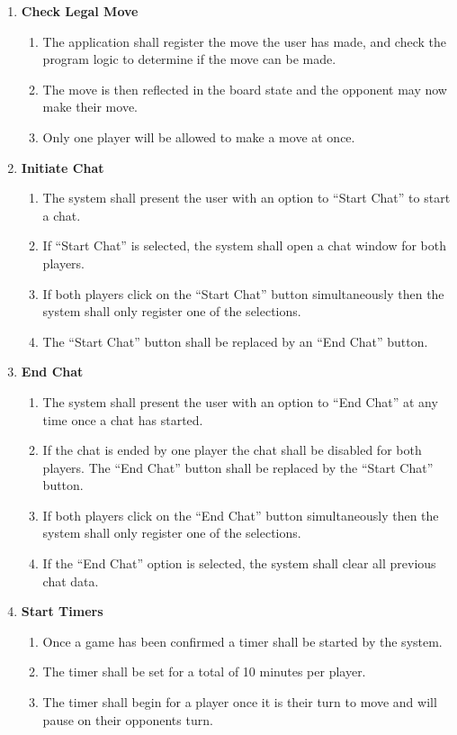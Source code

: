 \documentclass[]{article}
\begin{document}
\begin{enumerate}[{UC}1.]
	\item \textbf{Check Legal Move}
	\begin{enumerate}[{FR}1., resume]
		\item The application shall register the move the user has made, and check the program logic to determine if the move can be made.
		\item The move is then reflected in the board state and the opponent may now make their move.
		\item Only one player will be allowed to make a move at once.
	\end{enumerate}
	
	\item \textbf{Initiate Chat}
	\begin{enumerate}[{FR}1., resume]
		\item The system shall present the user with an option to ``Start Chat'' to start a chat.
		\item If ``Start Chat'' is selected, the system shall open a chat window for both players.
		\item If both players click on the ``Start Chat'' button simultaneously then the system shall only register one of the selections.
		\item The ``Start Chat'' button shall be replaced by an ``End Chat'' button.
	\end{enumerate}
	
	\item \textbf{End Chat}
	\begin{enumerate}[{FR}1., resume]
		\item The system shall present the user with an option to ``End Chat'' at any time once a chat has started.
		\item If the chat is ended by one player the chat shall be disabled for both players. The ``End Chat'' button shall be replaced by the ``Start Chat'' button.
		\item If both players click on the ``End Chat'' button simultaneously then the system shall only register one of the selections.
		\item If the ``End Chat'' option is selected, the system shall clear all previous chat data.
	\end{enumerate}
	
	\item \textbf{Start Timers}
	\begin{enumerate}[{FR}1., resume]
		\item Once a game has been confirmed a timer shall be started by the system.
		\item The timer shall be set for a total of 10 minutes per player.
		\item The timer shall begin for a player once it is their turn to move and will pause on their opponents turn.
	\end{enumerate}
	

\end{enumerate}
\end{document}
